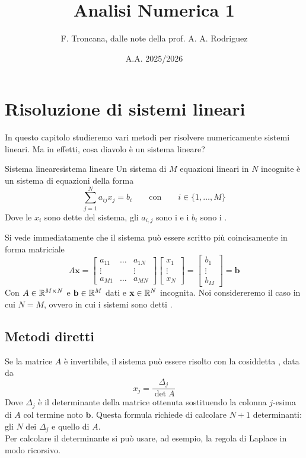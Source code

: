 \documentclass[openany]{book}
\title{Analisi Numerica 1}
\author{F. Troncana, dalle note della prof. A. A. Rodriguez}
\date{A.A. 2025/2026}
\begin{document}
\maketitle

\tableofcontents 

\chapter{Risoluzione di sistemi lineari}

In questo capitolo studieremo vari metodi per risolvere numericamente sistemi lineari. Ma in effetti, cosa diavolo è un sistema lineare?

\begin{definition}{Sistema lineare}{sistema lineare}
    Un sistema di $M$ equazioni lineari in $N$ incognite è un sistema di equazioni della forma 
    \[ \sum_{j=1}^N a_{ij}x_j = b_i \qquad \text{con}\qquad i \in \{ 1,\dots, M \}\]
    Dove le $x_i$ sono dette  del sistema, gli $a_{i,j}$ sono i  e i $b_i$ sono i .
\end{definition}

Si vede immediatamente che il sistema può essere scritto più coincisamente in forma matriciale 
\[ A\mathbf{x} = \begin{bmatrix}
    a_{11} & \dots & a_{1N} \\ \vdots & & \vdots \\ a_{M1} & \dots & a_{MN} \end{bmatrix}\begin{bmatrix} x_1 \\ \vdots \\ x_N \end{bmatrix} = \begin{bmatrix}
        b_1 \\ \vdots \\ b_M
    \end{bmatrix} = \mathbf{b} \]
Con $A \in \mathbb{R}^{M\times N}$ e $\mathbf b \in \mathbb{R}^M$ dati e $\mathbf x \in \mathbb{R}^N$ incognita. Noi considereremo il caso in cui $N=M$, ovvero in cui i sistemi sono detti .

\section{Metodi diretti}

Se la matrice $A$ è invertibile, il sistema può essere risolto con la cosiddetta , data da 
\[ x_j = \frac{\Delta_j}{\det A} \]
Dove $\Delta_j$ è il determinante della matrice ottenuta sostituendo la colonna $j$-esima di $A$ col termine noto $\mathbf{b}$. Questa formula richiede di calcolare $N+1$ determinanti: gli $N$ dei $\Delta_j$ e quello di $A$.\\
Per calcolare il determinante si può usare, ad esempio, la regola di Laplace in modo ricorsivo.
\end{document}
